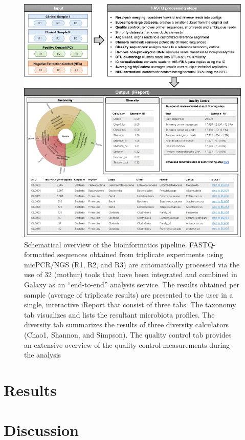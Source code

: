 \begin{figure}
\centering
\includegraphics[scale=0.5]{chapters/images/mycrobiota/mycrobiota-fig1.png}
\caption{Schematical overview of the bioinformatics pipeline. FASTQ-formatted sequences obtained from triplicate experiments using micPCR/NGS (R1, R2, and R3) are automatically processed via the use of 32 (mothur) tools that have been integrated and combined in Galaxy as an “end-to-end” analysis service. The results obtained per sample (average of triplicate results) are presented to the user in a single, interactive iReport that consist of three tabs. The taxonomy tab visualizes and lists the resultant microbiota profiles. The diversity tab summarizes the results of three diversity calculators (Chao1, Shannon, and Simpson). The quality control tab provides an extensive overview of the quality control measurements during the analysis}
\label{fig:mycrobiota-pipeline}
\end{figure}


\section*{Results}

\section*{Discussion}

